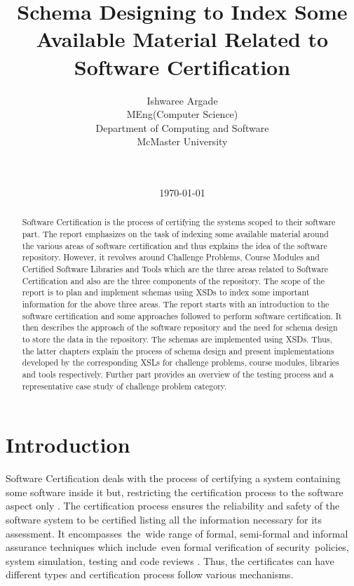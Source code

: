 \documentclass[11pt,letterpaper]{report}
\title{Schema Designing to Index Some Available Material Related to Software Certification}
\author{
        \normalsize
        Ishwaree Argade
            \mbox{}\\ %
        \normalsize MEng(Computer Science)
         \mbox{} \\
       \normalsize Department of Computing and Software 
                \mbox{}\\ %
        \normalsize McMaster University 
        \mbox{} \\
        \date{\today} \\
}
\begin{document}
\maketitle

\begin{abstract}

Software Certification is the process of certifying the systems scoped to their software part. The report emphasizes on the task of indexing some available material around the various areas of software certification and thus explains the idea of the software repository. However, it revolves around Challenge Problems, Course Modules and Certified Software Libraries and Tools which are the three areas related to Software Certification and also are the three components of the repository. The scope of the report is to plan and implement schemas using XSDs to index some important information for the above three areas. The report starts with an introduction to the software certification and some approaches followed to perform software certification. It then describes the approach of the software repository and the need for schema design to store the data in the repository. The schemas are implemented using XSDs. Thus, the latter chapters explain the process of schema design and present implementations developed by the corresponding XSLs for challenge problems, course modules, libraries and tools respectively. Further part provides an overview of the testing process and a representative case study of challenge problem category.  
\end{abstract}

\setcounter{tocdepth}{2}
\tableofcontents

\chapter{Introduction}

Software Certification deals with the process of certifying a system containing some software inside it but, restricting the certification process to the software aspect only \cite{seminar}. The certification process ensures the reliability and safety of the software system to be certified listing all the information necessary for its assessment. It encompasses the wide range of formal, semi-formal and informal assurance techniques which include even formal verification of security policies, system simulation, testing and code reviews \cite{SCMS}. Thus, the certificates can have different types and certification process follow various mechanisms.
\end{document}
